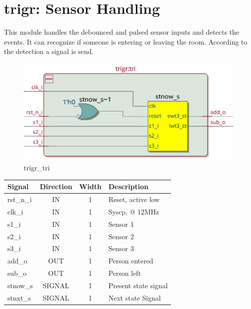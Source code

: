 \documentclass[12pt,a4 paper] {report}
\begin{document}
\newpage

\section{trigr: Sensor Handling}
This module handles the debounced and pulsed sensor inputs and detects the events. It can recognize if someone is entering 
or leaving the room. According to the detection a signal is send.
\begin{figure}[h]
	\centering	
	\includegraphics[scale=0.2]{../png/trigr_tri.png}
	\caption{trigr\_tri}
\end{figure}
\begin{center}
	\begin{tabular}{ | p{2cm} | c | c | p{5cm} |}
		\hline
		\textbf{Signal} & \textbf{Direction} & \textbf{Width} & \textbf{Description} \\
		\hline
		\hline
		rst\_n\_i & IN & 1 & Reset, active low \\
		\hline
		clk\_i & IN & 1 & Syscp, @ 12MHz \\
		\hline
		s1\_i & IN & 1 & Sensor 1 \\
		\hline
		s2\_i & IN & 1 & Sensor 2 \\
		\hline
		s3\_i & IN & 1 & Sensor 3 \\
		\hline
		add\_o & OUT & 1 & Person entered \\
		\hline
		sub\_o & OUT & 1 & Person left \\
		\hline
		\hline
		stnow\_s & SIGNAL & 1 & Present state signal \\
		\hline
		stnxt\_s & SIGNAL & 1 & Next state Signal \\
		\hline

	\end{tabular}
\end{center}

\newpage
\end{document}
